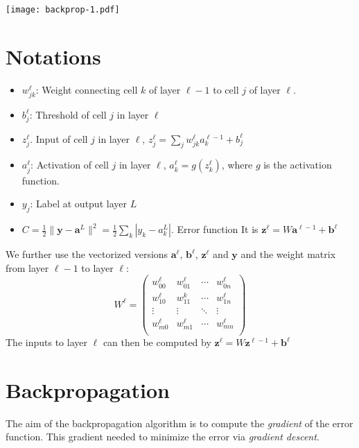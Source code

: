\documentclass{article}
\newcommand{\vc}[1]{\boldsymbol{#1}}
\begin{document}
    \texttt{[image: backprop-1.pdf]}

    \def\inn{\text{in}}

    \section{Notations}

    \begin{itemize}
        \item $w_{jk}^\ell$: Weight connecting cell $k$ of layer $\ell -1$ to cell $j$ of layer $\ell$. 
        \item $b_j^\ell$: Threshold of cell $j$ in layer $\ell$
        \item $z_j^\ell$. Input of cell $j$ in layer $\ell$, $z_j^\ell = \sum_j w_{jk}^\ell a_k^{\ell-1} + b_j^\ell$  
        \item $a_j^\ell$: Activation of cell $j$ in layer $\ell$, $a_k^{\ell} = g(z_k^\ell)$, where $g$ is the activation function.
        \item $y_j$: Label at output layer $L$
        \item $C=\frac12 \| \vc{y} - \vc{a}^L \|^2 = \frac12 \sum_{k} | y_k - a_k^L |$. Error function 
        It is $\vc{z}^{\ell} = W\vc{a}^{\ell-1} + \vc{b}^\ell$
    \end{itemize}

    We further use the vectorized versions $\vc{a}^\ell$, $\vc{b}^\ell$, $\vc{z}^\ell$ and $\vc{y}$ and 
    the weight matrix from layer $\ell-1$ to layer $\ell$:
    \[
    W^\ell = 
    \begin{pmatrix}
        w_{00}^\ell & w_{01}^\ell & \cdots & w_{0n}^\ell \\
        w_{10}^\ell & w_{11}^k & \cdots & w_{1n}^\ell \\
        \vdots   & \vdots & \ddots & \vdots \\
        w_{m0}^\ell & w_{m1}^\ell & \cdots & w_{mn}^\ell \\ 
    \end{pmatrix}
    \]
    The inputs to layer $\ell$ can then be computed by $\vc{z}^\ell = W\vc{z}^{\ell-1}+\vc{b}^\ell$

    \section{Backpropagation}

    The aim of the backpropagation algorithm is to compute the \textit{gradient} of the 
    error function. This gradient needed to minimize the error via \textit{gradient descent}. 
    
\end{document}
